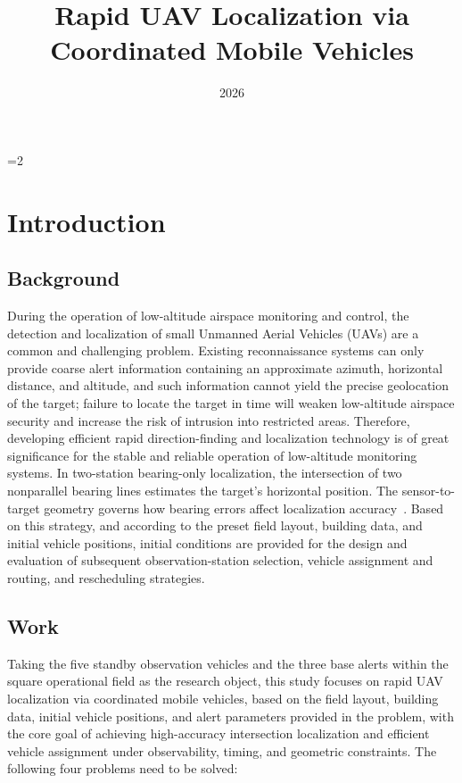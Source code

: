 \documentclass{swmcmthesis}
\title{Rapid UAV Localization via Coordinated Mobile Vehicles} %
\date{2026}
\begin{document}
\maketitle
{\linespread{1.16}\selectfont
\value{tocdepth}=2\relax %
\tableofcontents
\par}

\newpage

\setcounter{page}{1}
\begingroup
\linespread{1.24}\selectfont
\setlength{\textfloatsep}{12pt plus 2pt minus 2pt}
\section{Introduction}



\subsection{Background}
During the operation of low-altitude airspace monitoring and control, the detection and localization of small Unmanned Aerial Vehicles (UAVs) are a common and challenging problem. Existing reconnaissance systems can only provide coarse alert information containing an approximate azimuth, horizontal distance, and altitude, and such information cannot yield the precise geolocation of the target; failure to locate the target in time will weaken low-altitude airspace security and increase the risk of intrusion into restricted areas. Therefore, developing efficient rapid direction-finding and localization technology is of great significance for the stable and reliable operation of low-altitude monitoring systems. In two-station bearing-only localization, the intersection of two nonparallel bearing lines estimates the target's horizontal position. The sensor-to-target geometry governs how bearing errors affect localization accuracy~\cite{ref:bearing-geometry}. Based on this strategy, and according to the preset field layout, building data, and initial vehicle positions, initial conditions are provided for the design and evaluation of subsequent observation-station selection, vehicle assignment and routing, and rescheduling strategies.
\subsection{Work}
Taking the five standby observation vehicles and the three base alerts within the square operational field as the research object, this study focuses on rapid UAV localization via coordinated mobile vehicles, based on the field layout, building data, initial vehicle positions, and alert parameters provided in the problem, with the core goal of achieving high-accuracy intersection localization and efficient vehicle assignment under observability, timing, and geometric constraints. The following four problems need to be solved:
\end{document}
